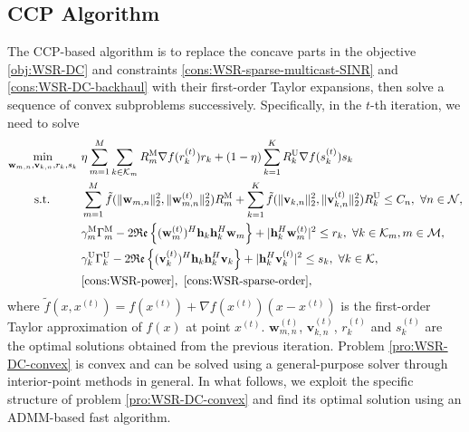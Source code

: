 \documentclass[12pt, draftclsnofoot, onecolumn]{IEEEtran}
\begin{document}
\subsection{CCP Algorithm}
The CCP-based algorithm is to replace the concave parts in the objective \eqref{obj:WSR-DC} and constraints \eqref{cons:WSR-sparse-multicast-SINR} and \eqref{cons:WSR-DC-backhaul} with their first-order Taylor expansions, then solve a sequence of convex subproblems successively. Specifically, in the $t$-th iteration, we need to solve
\begin{subequations}
\begin{align}
\mathop{\text{min}}_{\mathbf{w}_{m,n}, \mathbf{v}_{k,n}, r_{k}, s_{k}} ~& \eta \sum_{m=1}^M \sum_{k \in \mathcal{K}_m} R_{m}^{\text{M}} \nabla f(r_{k}^{(t)}) r_{k} + (1 - \eta) \sum_{k=1}^K R_k^{\text{U}} \nabla f(s_{k}^{(t)}) s_{k} \label{obj:WSR-DC-convex}\\
\text{s.t.} \qquad ~~ & \sum_{m=1}^M \tilde{f}(\lVert \mathbf{w}_{m,n} \rVert_2^2, \lVert \mathbf{w}_{m,n}^{(t)} \rVert_2^2) R_{m}^{\text{M}} + \sum_{k=1}^K \tilde{f}(\lVert \mathbf{v}_{k,n} \rVert_2^2, \lVert \mathbf{v}_{k,n}^{(t)} \rVert_2^2) R_k^{\text{U}} \leq C_n,~\forall n \in \mathcal{N}, \label{cons:WSR-DC-convex-backhaul}\\
& \gamma_{m}^{\text{M}} \Gamma_{m}^{\text{M}} - 2 \mathfrak{Re} \left \{ (\mathbf{w}_{m}^{(t)})^H \mathbf{h}_k \mathbf{h}_k^H \mathbf{w}_{m} \right \} + \lvert \mathbf{h}_k^H \mathbf{w}_{m}^{(t)} \rvert^2 \leq r_{k},~\forall k \in \mathcal{K}_{m}, m \in \mathcal{M},\label{cons:WSR-DC-convex-multicast-SINR} \\
& \gamma_{k}^{\text{U}} \Gamma_{k}^{\text{U}} - 2 \mathfrak{Re} \left \{ (\mathbf{v}_{k}^{(t)})^H \mathbf{h}_k \mathbf{h}_k^H \mathbf{v}_{k} \right \} + \lvert \mathbf{h}_k^H \mathbf{v}_{k}^{(t)} \rvert^2 \leq s_{k}, ~\forall k \in \mathcal{K}, \label{cons:WSR-DC-convex-unicast-SINR} \\
& \eqref{cons:WSR-power},~\eqref{cons:WSR-sparse-order}, \nonumber
\end{align} \label{pro:WSR-DC-convex}
\end{subequations}
where $\tilde{f}(x, x^{(t)}) = f(x^{(t)}) + \nabla f(x^{(t)}) (x - x^{(t)}) $ is the first-order Taylor approximation of $f(x)$ at point $x^{(t)}$. $\mathbf{w}_{m,n}^{(t)}$, $\mathbf{v}_{k,n}^{(t)}$, $r_{k}^{(t)}$ and $s_{k}^{(t)}$ are the optimal solutions obtained from the previous iteration. Problem \eqref{pro:WSR-DC-convex} is convex and can be solved using a general-purpose solver through interior-point methods in general. In what follows, we exploit the specific structure of problem \eqref{pro:WSR-DC-convex} and find its optimal solution using an ADMM-based fast algorithm.
\end{document}
